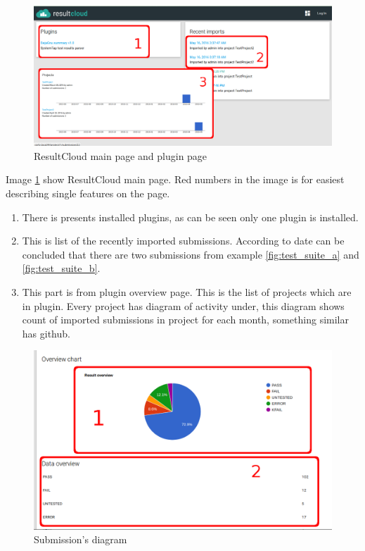 \begin{figure}[h]
  \centering
    \includegraphics[scale=0.3]{fig/main_page.png}
  \caption{ResultCloud main page and plugin page}
  \label{fig:resultcloud_main}
\end{figure}

Image \ref{fig:resultcloud_main} show ResultCloud main page. Red numbers in the image is for easiest describing single features on the page.

\begin{enumerate}
\item There is presents installed plugins, as can be seen only one plugin is installed.
\item This is list of the recently imported submissions. According to date can be concluded that there are two submissions from example \ref{fig:test_suite_a} and \ref{fig:test_suite_b}.
\item This part is from plugin overview page. This is the list of projects which are in plugin. Every project has diagram of activity under, this diagram shows count of imported submissions in project for each month, something similar has github. 
\end{enumerate}

\begin{figure}[h]
  \centering
    \includegraphics[scale=0.3]{fig/submission_chart.png}
  \caption{Submission's diagram}
  \label{fig:resultcloud_chart}
\end{figure}

